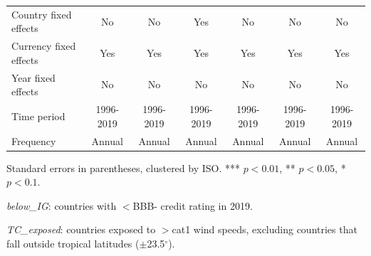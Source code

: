 \documentclass[10pt]{article}
\begin{document}
\begin{table}[h!]
\begin{threeparttable}
\begin{tabular}{lcccccc}
    Country fixed effects & No & No & Yes & No & No & No \\
    Currency fixed effects & Yes & Yes & Yes & Yes & Yes & Yes \\
    Year fixed effects & No & No & No & No & No & No \\
    Time period & 1996-2019 & 1996-2019 & 1996-2019 & 1996-2019 & 1996-2019 & 1996-2019 \\
    Frequency & Annual & Annual & Annual & Annual & Annual & Annual \\
    \bottomrule
  \end{tabular}
  \begin{tablenotes}
    \footnotesize
    \item Standard errors in parentheses, clustered by ISO. *** $p<0.01$, ** $p<0.05$, * $p<0.1$.
    \item \textit{below\_IG}: countries with $<$BBB- credit rating in 2019.
    \item \textit{TC\_exposed}: countries exposed to $>$cat1 wind speeds, excluding countries that fall outside tropical latitudes ($\pm$23.5$^\circ$).
  \end{tablenotes}
  \end{threeparttable}
\end{table}
\end{document}
